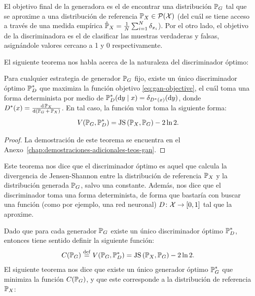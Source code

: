 El objetivo final de la generadora es el de encontrar una distribución $\Prob_G$ tal que se aproxime a una distribución de referencia $\Prob_X \in \ProbSpace[\cX]$ (del cuál se tiene acceso a través de una medida empírica $\hat \Prob_X = \frac{1}{N} \sum_{i=1}^{N} \delta_{x_i}$). Por el otro lado, el objetivo de la discriminadora es el de clasificar las muestras verdaderas y falsas, asignándole valores cercano a 1 y 0 respectivamente.

El siguiente teorema nos habla acerca de la naturaleza del discriminador óptimo:

\begin{theorem}
	\label{thm:gan-optimal-discriminator}
	Para cualquier estrategia de generador $\Prob_G$ fijo, existe un único discriminador óptimo $\Prob_D^\ast$ que maximiza la función objetivo \eqref{eq:gan-objective}, el cuál toma una forma determinista por medio de $\Prob_D^\ast(\dd y \mid x) = \delta_{D^\ast(x)}(\dd y)$, donde $D^\ast(x) = \dv{\Prob_X}{(\Prob_G+\Prob_X)}$. En tal caso, la función valor toma la siguiente forma:
	\begin{equation}
		V(\Prob_G, \Prob_D^\ast) = \JS{\Prob_X}{\Prob_G} - 2 \ln 2.
	\end{equation}
\end{theorem}

\begin{proof}
	La demostración de este teorema se encuentra en el Anexo~\ref{chap:demostraciones-adicionales-teos-gan}.
\end{proof}

Este teorema nos dice que el discriminador óptimo es aquel que calcula la divergencia de Jensen-Shannon entre la distribución de referencia $\Prob_X$ y la distribución generada $\Prob_G$, salvo una constante. Además, nos dice que el discriminador toma una forma determinista, de forma que bastaría con buscar una función (como por ejemplo, una red neuronal) $D\colon\mathcal{X}\to [0, 1]$ tal que la aproxime.

Dado que para cada generador $\Prob_G$ existe un único discriminador óptimo $\Prob_D^\ast$, entonces tiene sentido definir la siguiente función:
\begin{equation}
	C(\Prob_G) \eqdef V(\Prob_G, \Prob_D^\ast) = \JS{\Prob_X}{\Prob_G} - 2 \ln 2.
\end{equation}
El siguiente teorema nos dice que existe un único generador óptimo $\Prob_G^\ast$ que minimiza la función $C(\Prob_G)$, y que este corresponde a la distribución de referencia $\Prob_X$:

